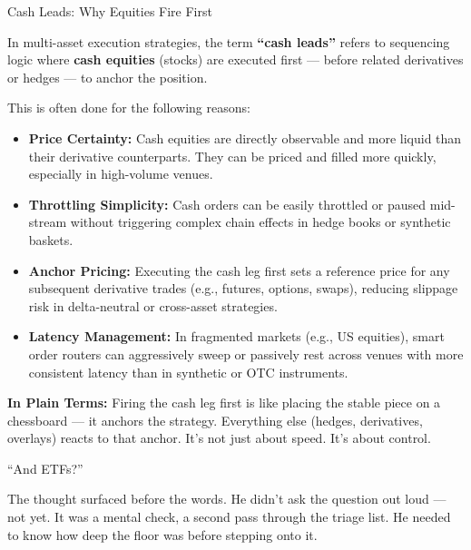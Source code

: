 \begin{TechnicalSidebar}{Cash Leads: Why Equities Fire First}

    In multi-asset execution strategies, the term \textbf{``cash leads''} refers to sequencing logic where 
    \textbf{cash equities} (stocks) are executed first — before related derivatives or hedges — to anchor the position.
    
    \medskip
    
    This is often done for the following reasons:

    \medskip
    
    \begin{itemize}
      \item \textbf{Price Certainty:}  
      Cash equities are directly observable and more liquid than their derivative counterparts. They can be priced and filled more quickly, especially in high-volume venues.
    
      \item \textbf{Throttling Simplicity:}  
      Cash orders can be easily throttled or paused mid-stream without triggering complex chain effects in hedge books or synthetic baskets.
    
      \item \textbf{Anchor Pricing:}  
      Executing the cash leg first sets a reference price for any subsequent derivative trades (e.g., futures, options, swaps), reducing slippage risk in delta-neutral or cross-asset strategies.
    
      \item \textbf{Latency Management:}  
      In fragmented markets (e.g., US equities), smart order routers can aggressively sweep or passively rest across venues with more consistent latency than in synthetic or OTC instruments.
    \end{itemize}
    
    \medskip
    
    \textbf{In Plain Terms:}  
    Firing the cash leg first is like placing the stable piece on a chessboard — it anchors the strategy.  
    Everything else (hedges, derivatives, overlays) reacts to that anchor.  
    It’s not just about speed.  
    It’s about control.


    
\end{TechnicalSidebar}

\medskip


“And ETFs?”

The thought surfaced before the words. He didn’t ask the question out loud — not yet. It was a mental check, a second pass through the triage list. He needed to know how deep the floor was before stepping onto it.

